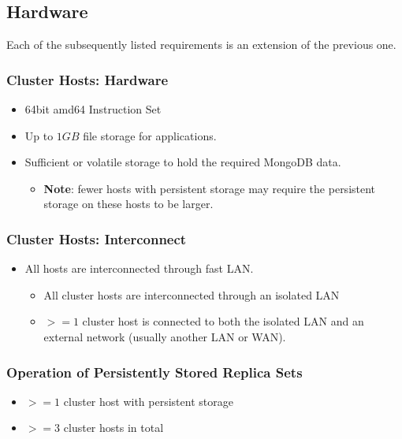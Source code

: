 \documentclass[a4paper, 11pt]{article}
\begin{document}
\subsection{Hardware}
Each of the subsequently listed requirements is an extension of the previous one.
\subsubsection{Cluster Hosts: Hardware}
\begin{itemize}
	\item 64bit amd64 Instruction Set
	\item Up to $1GB$ file storage for \mamid applications.
	\item Sufficient  or \gls{volatile storage} to hold the required \gls{MongoDB} data. \\
	\begin{itemize}
		\item \textbf{Note}: fewer \glspl{host} with \gls{persistent storage} may require the \gls{persistent storage} on these \glspl{host} to be larger.
	\end{itemize}
\end{itemize}

\subsubsection{Cluster Hosts: Interconnect}
\begin{itemize}
	\item All hosts are interconnected through fast \acrshort{LAN}.
	\begin{itemize}
		\item All cluster hosts are interconnected through an isolated \acrshort{LAN}
		\item $>= 1$ cluster host is connected to both the isolated \acrshort{LAN} and an external network (usually another \acrshort{LAN} or \acrshort{WAN}).
	\end{itemize}
\end{itemize}

\subsubsection{Operation of Persistently Stored Replica Sets}
\begin{itemize}
	\item $>= 1$ cluster host with \gls{persistent storage}
	\item $>= 3$ cluster hosts in total
\end{itemize}
\end{document}

